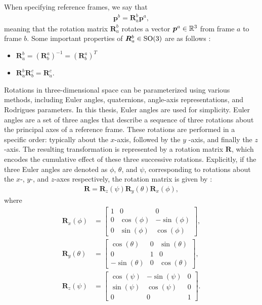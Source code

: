 When specifying reference frames, we say that
\begin{align}
    \bm{p}^b = \bm{R}_{a}^b \bm{p}^a,
\end{align}
meaning that the rotation matrix $\bm{R}_{a}^b$ rotates a vector
$\bm{p}^a\in\mathbb{R}^3$ from frame $a$ to frame $b$. Some important properties
of $\bm{R}_a^b \in \operatorname{SO}(3)$ are as follows \cite{modsim}:
\begin{itemize}
\item $\bm{R}_a^b = (\bm{R}_b^a)^{-1} = (\bm{R}_b^a)^T$
\item $\bm{R}_a^b \bm{R}_b^c = \bm{R}_a^c$.
\end{itemize}

Rotations in three-dimensional space can be parameterized using various methods,
including Euler angles, quaternions, angle-axis representations, and
Rodrigues parameters. In this thesis, Euler angles are used for simplicity.
Euler angles are a set of three angles that describe a sequence of three
rotations about the principal axes of a reference frame. These rotations are
performed in a specific order: typically about the $x$-axis, followed by the $y$
-axis, and finally the $z$-axis. The resulting transformation is represented by
a rotation matrix $\bm{R}$, which encodes the cumulative effect of these three
successive rotations.
Explicitly, if the three Euler angles are denoted as $\phi$, $\theta$, and $\psi$,
corresponding to rotations about the $x$-, $y$-, and $z$-axes respectively,
the rotation matrix is given by \cite{modsim}:
\begin{align}
    \bm{R} = \bm{R}_z(\psi) \bm{R}_y(\theta) \bm{R}_x(\phi),
\end{align}
where
\begin{subequations}
\begin{align}
    \bm{R}_x(\phi) &= \begin{bmatrix}
        1 & 0 & 0 \\
        0 & \cos(\phi) & -\sin(\phi) \\
        0 & \sin(\phi) & \cos(\phi)
    \end{bmatrix}, \\
    \bm{R}_y(\theta) &= \begin{bmatrix}
        \cos(\theta) & 0 & \sin(\theta) \\
        0 & 1 & 0 \\
        -\sin(\theta) & 0 & \cos(\theta)
    \end{bmatrix}, \\
    \bm{R}_z(\psi) &= \begin{bmatrix}
        \cos(\psi) & -\sin(\psi) & 0 \\
        \sin(\psi) & \cos(\psi) & 0 \\
        0 & 0 & 1
    \end{bmatrix}.
\end{align}
\end{subequations}
